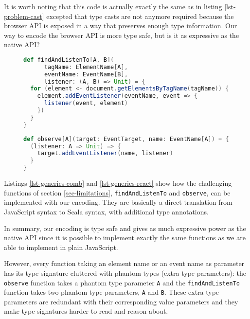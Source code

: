 \documentclass{llncs}
\newcommand{\jscode}[1]{\lstinline[language=JavaScript]|#1|}
\newcommand{\scalacode}[1]{\lstinline[language=Scala]|#1|}
\begin{document}
It is worth noting that this code is actually exactly the same as in listing \ref{lst-problem-cast} excepted that type casts are not anymore required because the browser API is exposed in a way that preserves enough type information. Our way to encode the browser API is more type safe, but is it as expressive as the native API?

\begin{figure}
\begin{lstlisting}[label=lst-generics-comb,language=Scala,caption={Combination of \scalacode{getElementsByTagName} and \scalacode{addEventListener} functions encoded using type parameters}]
def findAndListenTo[A, B](
      tagName: ElementName[A],
      eventName: EventName[B],
      listener: (A, B) => Unit) = {
  for (element <- document.getElementsByTagName(tagName)) {
    element.addEventListener(eventName, event => {
      listener(event, element)
    })
  }
}
\end{lstlisting}
\end{figure}

\begin{figure}
\begin{lstlisting}[label=lst-generics-react,language=Scala,caption={Partial application of \scalacode{addEventListener} encoded with type parameters}]
def observe[A](target: EventTarget, name: EventName[A]) = {
  (listener: A => Unit) => {
    target.addEventListener(name, listener)
  }
}
\end{lstlisting}
\end{figure}

Listings \ref{lst-generics-comb} and \ref{lst-generics-react} show how the challenging functions of section \ref{sec-limitations}, \jscode{findAndListenTo} and \jscode{observe}, can be implemented with our encoding. They are basically a direct translation from JavaScript syntax to Scala syntax, with additional type annotations.

In summary, our encoding is type safe and gives as much expressive power as the native API since it is possible to implement exactly the same functions as we are able to implement in plain JavaScript.

However, every function taking an element name or an event name as parameter has its type signature cluttered with phantom types (extra type parameters): the \scalacode{observe} function takes a phantom type parameter \scalacode{A} and the \scalacode{findAndListenTo} function takes two phantom type parameters, \scalacode{A} and \scalacode{B}. These extra type parameters are redundant with their corresponding value parameters and they make type signatures harder to read and reason about.
\end{document}
